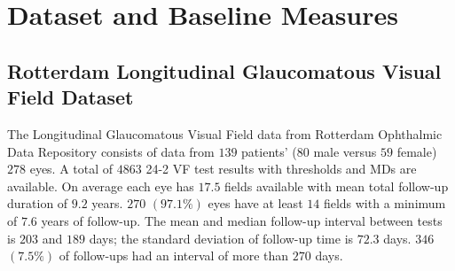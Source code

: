 \chapter{Dataset and Baseline Measures}

\section{Rotterdam Longitudinal Glaucomatous Visual Field Dataset}

The Longitudinal Glaucomatous Visual Field data from Rotterdam Ophthalmic Data Repository \cite{Bryan2013} consists of data from $139$ patients' ($80$ male versus $59$ female) $278$ eyes. A total of $4863$ 24-2 \acl{VF} test results with thresholds and \acp{MD} are available. On average each eye has $17.5$ fields available with mean total follow-up duration of $9.2$ years. $270$ $(97.1\%)$ eyes have at least $14$ fields with a minimum of $7.6$ years of follow-up. The mean and median follow-up interval between tests is $203$ and $189$ days; the standard deviation of follow-up time is $72.3$ days. $346$ $(7.5\%)$ of follow-ups had an interval of more than $270$ days. 


